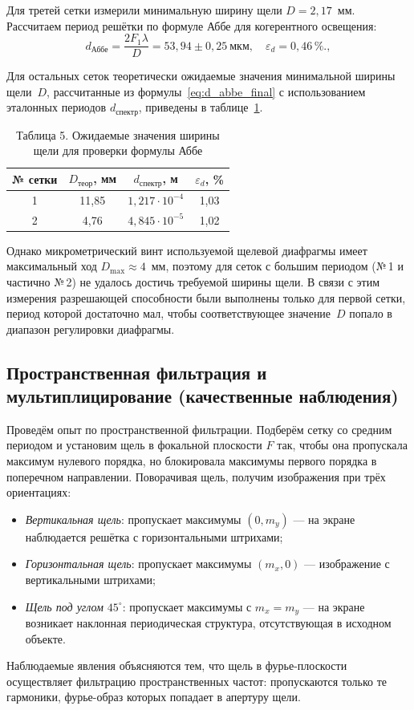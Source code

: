 \documentclass[a4paper]{article}
\begin{document}
Для третей сетки измерили минимальную ширину щели $D = 2{,}17$~мм. Рассчитаем период решётки по формуле Аббе для когерентного освещения:
\begin{equation}
    d_{\text{Аббе}} = \frac{2 F_1 \lambda}{D} = 53{,}94 \pm 0{,}25~\text{мкм}, \quad \varepsilon_d = 0{,}46\,\%.,
    \label{eq:d_abbe_final}
\end{equation}

Для остальных сеток теоретически ожидаемые значения минимальной ширины щели~$D$, рассчитанные из формулы~\eqref{eq:d_abbe_final} с использованием эталонных периодов $d_{\text{спектр}}$, приведены в таблице~\ref{tab:abbe_expected}.

\begin{table}[h!]
\centering
\begin{tabular}{|c|c|c|c|}
\hline
№ сетки & $D_{\text{теор}}$, мм & $d_{\text{спектр}}$, м & $\varepsilon_d$, \% \\
\hline
1 & 11,85 & $1{,}217 \cdot 10^{-4}$ & 1,03 \\
\hline
2 & 4,76 & $4{,}845 \cdot 10^{-5}$ & 1,02 \\
\hline
\end{tabular}
\caption{Таблица 5. Ожидаемые значения ширины щели для проверки формулы Аббе}
\label{tab:abbe_expected}
\end{table}

Однако микрометрический винт используемой щелевой диафрагмы имеет максимальный ход $D_{\max} \approx 4$~мм, поэтому для сеток с большим периодом (№\,1 и частично №\,2) не удалось достичь требуемой ширины щели. В связи с этим измерения разрешающей способности были выполнены только для первой сетки, период которой достаточно мал, чтобы соответствующее значение~$D$ попало в диапазон регулировки диафрагмы.

\subsection{Пространственная фильтрация и мультиплицирование (качественные наблюдения)}

Проведём опыт по пространственной фильтрации. Подберём сетку со средним периодом и установим щель в фокальной плоскости $F$ так, чтобы она пропускала максимум нулевого порядка, но блокировала максимумы первого порядка в поперечном направлении. Поворачивая щель, получим изображения при трёх ориентациях:
\begin{itemize}
    \item \textit{Вертикальная щель}: пропускает максимумы $(0, m_y)$ --- на экране наблюдается решётка с горизонтальными штрихами;
    \item \textit{Горизонтальная щель}: пропускает максимумы $(m_x, 0)$ --- изображение с вертикальными штрихами;
    \item \textit{Щель под углом $45^\circ$}: пропускает максимумы с $m_x = m_y$ --- на экране возникает наклонная периодическая структура, отсутствующая в исходном объекте.
\end{itemize}
Наблюдаемые явления объясняются тем, что щель в фурье-плоскости осуществляет фильтрацию пространственных частот: пропускаются только те гармоники, фурье-образ которых попадает в апертуру щели.
\end{document}
